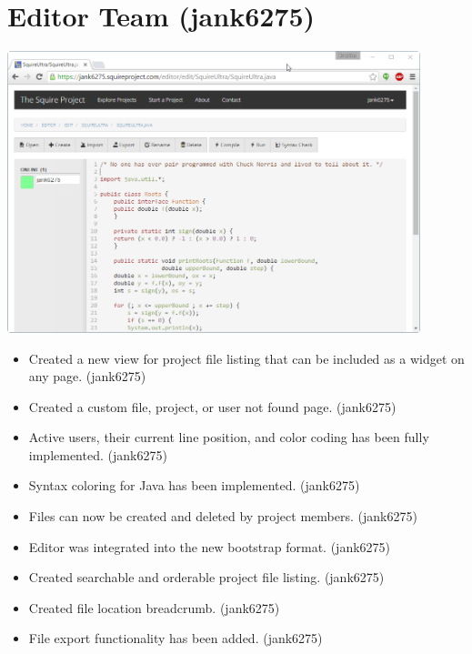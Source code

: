 \documentclass[11pt]{report}
\begin{document}
\section{Editor Team (jank6275)}
    \includegraphics[width=0.9\textwidth]{images/editor}
    \begin{itemize}
        \item Created a new view for project file listing that can be included as a widget on any page. (jank6275)
        \item Created a custom file, project, or user not found page. (jank6275)
        \item Active users, their current line position, and color coding has been fully implemented. (jank6275)
        \item Syntax coloring for Java has been implemented. (jank6275)
        \item Files can now be created and deleted by project members. (jank6275)
        \item Editor was integrated into the new bootstrap format. (jank6275)
        \item Created searchable and orderable project file listing. (jank6275)
        \item Created file location breadcrumb. (jank6275)
        \item File export functionality has been added. (jank6275)
    \end{itemize}
    
\end{document}
